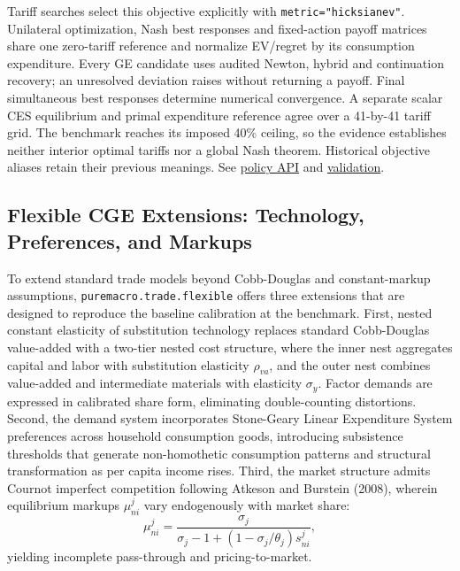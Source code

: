 \documentclass[11pt,letterpaper]{article}
\renewcommand{\_}{\pmunderscore\allowbreak}
\begin{document}
Tariff searches select this objective explicitly with \texttt{metric="hicksian\_ev"}.
Unilateral optimization, Nash best responses and fixed-action payoff matrices
share one zero-tariff reference and normalize EV/regret by its consumption
expenditure. Every GE candidate uses audited Newton, hybrid and continuation
recovery; an unresolved deviation raises without returning a payoff. Final
simultaneous best responses determine numerical convergence. A separate scalar
CES equilibrium and primal expenditure reference agree over a 41-by-41 tariff
grid. The benchmark reaches its imposed 40\% ceiling, so the evidence establishes
neither interior optimal tariffs nor a global Nash theorem. Historical objective
aliases retain their previous meanings. See \href{https://github.com/jalonso1979/puremacro/blob/v4.6.0/docs/trade_policy.md}{policy API}
and \href{https://github.com/jalonso1979/puremacro/blob/v4.6.0/reviews/2026-09-20-hicksian-policy/REPORT.md}{validation}.

\subsection{Flexible CGE Extensions: Technology, Preferences, and Markups}\label{flexible-cge-extensions-technology-preferences-and-markups}

To extend standard trade models beyond Cobb-Douglas and constant-markup assumptions, \texttt{puremacro.trade.flexible} offers three extensions that are designed to reproduce the baseline calibration at the benchmark. First, nested constant elasticity of substitution technology replaces standard Cobb-Douglas value-added with a two-tier nested cost structure, where the inner nest aggregates capital and labor with substitution elasticity \(\rho_{va}\), and the outer nest combines value-added and intermediate materials with elasticity \(\sigma_y\). Factor demands are expressed in calibrated share form, eliminating double-counting distortions. Second, the demand system incorporates Stone-Geary Linear Expenditure System preferences across household consumption goods, introducing subsistence thresholds that generate non-homothetic consumption patterns and structural transformation as per capita income rises. Third, the market structure admits Cournot imperfect competition following Atkeson and Burstein (2008), wherein equilibrium markups \(\mu_{ni}^j\) vary endogenously with market share:
\[\mu_{ni}^j = \frac{\sigma_j}{\sigma_j - 1 + (1 - \sigma_j / \theta_j) s_{ni}^j},\]
yielding incomplete pass-through and pricing-to-market.
\end{document}
